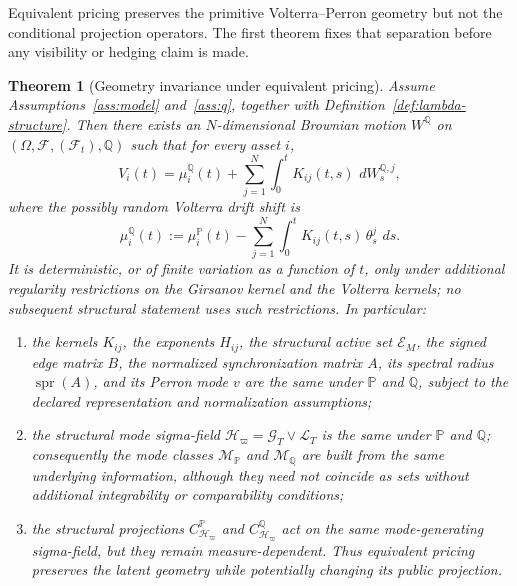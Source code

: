 \documentclass[11pt,a4paper]{amsart}
\theoremstyle{plain}
\newtheorem{theorem}{Theorem}[section]
\theoremstyle{definition}
\theoremstyle{remark}
\DeclareMathOperator{\spr}{spr}
\newcommand{\PP}{\mathbb{P}}
\newcommand{\QQ}{\mathbb{Q}}
\newcommand{\cF}{\mathcal{F}}
\newcommand{\cG}{\mathcal{G}}
\newcommand{\cH}{\mathcal{H}}
\newcommand{\cE}{\mathcal{E}}
\newcommand{\cL}{\mathcal{L}}
\newcommand{\cM}{\mathcal{M}}
\newcommand{\dd}{\,d}
\begin{document}
Equivalent pricing preserves the primitive Volterra--Perron geometry but not the conditional
projection operators.  The first theorem fixes that separation before any visibility or hedging
claim is made.

\begin{theorem}[Geometry invariance under equivalent pricing]\label{thm:q-invariance}
Assume Assumptions~\ref{ass:model} and~\ref{ass:q}, together with
Definition~\ref{def:lambda-structure}.  Then there exists an
\(N\)-dimensional Brownian motion \(W^\QQ\) on \((\Omega,\cF,(\cF_t),\QQ)\) such that for every
asset \(i\),
\[
       V_i(t)
       =
       \mu_i^\QQ(t)
       +
       \sum_{j=1}^N \int_0^t K_{ij}(t,s)\,\dd W_s^{\QQ,j},
\]
where the possibly random Volterra drift shift is
\[
       \mu_i^\QQ(t)
       :=
       \mu_i^\PP(t)
       -
       \sum_{j=1}^N \int_0^t K_{ij}(t,s)\,\theta_s^j\,\dd s.
\]
It is deterministic, or of finite variation as a function of \(t\), only under additional
regularity restrictions on the Girsanov kernel and the Volterra kernels; no subsequent structural
statement uses such restrictions.
In particular:
\begin{enumerate}[label=(\roman*)]
\item the kernels \(K_{ij}\), the exponents \(H_{ij}\), the structural active set \(\cE_M\), the
signed edge matrix \(B\), the normalized synchronization matrix \(A\), its spectral radius
\(\spr(A)\), and its Perron mode \(v\) are the same under \(\PP\) and \(\QQ\), subject to the
declared representation and normalization assumptions;
\item the structural mode sigma-field \(\cH_\varpi=\cG_T\vee \cL_T\) is the same under
\(\PP\) and \(\QQ\); consequently the mode classes \(\cM_\PP\) and \(\cM_\QQ\) are built from
the same underlying information, although they need not coincide as sets without additional
integrability or comparability conditions;
\item the structural projections \(C_{\cH_\varpi}^{\PP}\) and \(C_{\cH_\varpi}^{\QQ}\) act on
the same mode-generating sigma-field, but they remain measure-dependent.  Thus equivalent pricing
preserves the latent geometry while potentially changing its public projection.
\end{enumerate}
\end{theorem}
\end{document}
